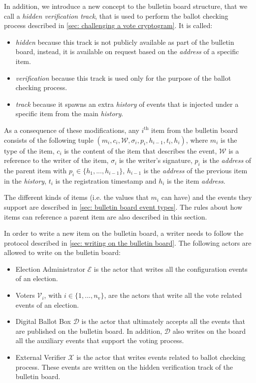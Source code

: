 In addition, we introduce a new concept to the bulletin board structure, that we call a \emph{hidden verification track}, that is used to perform the ballot checking process described in \cref{sec: challenging a vote cryptogram}. It is called:
\begin{itemize}
    \item \emph{hidden} because this track is not publicly available as part of the bulletin board, instead, it is available on request based on the \textit{address} of a specific item.
    \item \textit{verification} because this track is used only for the purpose of the ballot checking process.
    \item \emph{track} because it spawns an extra \textit{history} of events that is injected under a specific item from the main \textit{history}.
\end{itemize}

As a consequence of these modifications, any $i^\mathrm{th}$ item from the bulletin board consists of the following tuple $(m_i, c_i, \mathcal{W}, \sigma_i, p_i, h_{i-1}, t_i, h_i)$, where $m_i$ is the type of the item, $c_i$ is the content of the item that describes the event, $\mathcal{W}$ is a reference to the writer of the item, $\sigma_i$ is the writer's signature, $p_i$ is the \textit{address} of the parent item with $p_i \in \{h_1, ..., h_{i-1}\}$, $h_{i-1}$ is the \textit{address} of the previous item in the \textit{history}, $t_i$ is the registration timestamp and $h_i$ is the item \textit{address}.

The different kinds of items (i.e. the values that $m_i$ can have) and the events they support are described in \cref{sec: bulletin board event types}. The rules about how items can reference a parent item are also described in this section.

In order to write a new item on the bulletin board, a writer needs to follow the protocol described in \cref{sec: writing on the bulletin board}. The following actors are allowed to write on the bulletin board:
\begin{itemize}
    \item Election Administrator $\mathcal{E}$ is the actor that writes all the configuration events of an election.
    \item Voters $\mathcal{V}_i$, with $i \in \{1, ..., n_\mathrm{v}\}$, are the actors that write all the vote related events of an election.
    \item Digital Ballot Box $\mathcal{D}$ is the actor that ultimately accepts all the events that are published on the bulletin board. In addition, $\mathcal{D}$ also writes on the board all the auxiliary events that support the voting process.
    \item External Verifier $\mathcal{X}$ is the actor that writes events related to ballot checking process. These events are written on the hidden verification track of the bulletin board.
\end{itemize}


